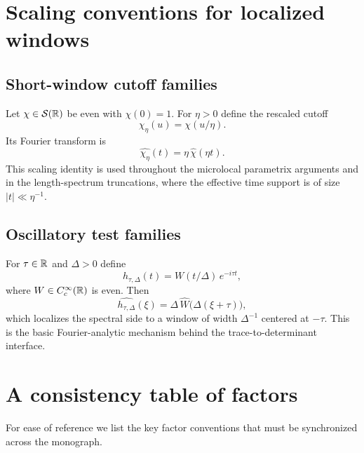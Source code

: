 \section{Scaling conventions for localized windows}
\label{sec:G.scaling}

\subsection{Short-window cutoff families}
\label{subsec:G.window}

Let $\chi\in \mathcal{S}(\mathbb{R})$ be even with $\chi(0)=1$.  For $\eta>0$ define the rescaled cutoff
\begin{equation}\label{eq:G.rescaled.cutoff}
\chi_\eta(u)=\chi(u/\eta).
\end{equation}
Its Fourier transform is
\begin{equation}\label{eq:G.rescaled.fourier}
\widehat{\chi_\eta}(t)
=
\eta\,\widehat{\chi}(\eta t).
\end{equation}
This scaling identity is used throughout the microlocal parametrix arguments and in the length-spectrum truncations,
where the effective time support is of size $|t|\ll \eta^{-1}$.

\subsection{Oscillatory test families}
\label{subsec:G.osc}

For $\tau\in\mathbb{R}$ and $\Delta>0$ define
\begin{equation}\label{eq:G.osc.family}
h_{\tau,\Delta}(t)=W(t/\Delta)\,e^{-i\tau t},
\end{equation}
where $W\in C_c^\infty(\mathbb{R})$ is even.
Then
\begin{equation}\label{eq:G.osc.transform}
\widehat{h_{\tau,\Delta}}(\xi)
=
\Delta\,\widehat{W}\big(\Delta(\xi+\tau)\big),
\end{equation}
which localizes the spectral side to a window of width $\Delta^{-1}$ centered at $-\tau$.
This is the basic Fourier-analytic mechanism behind the trace-to-determinant interface.

\section{A consistency table of factors}
\label{sec:G.table}

For ease of reference we list the key factor conventions that must be synchronized across the monograph.

